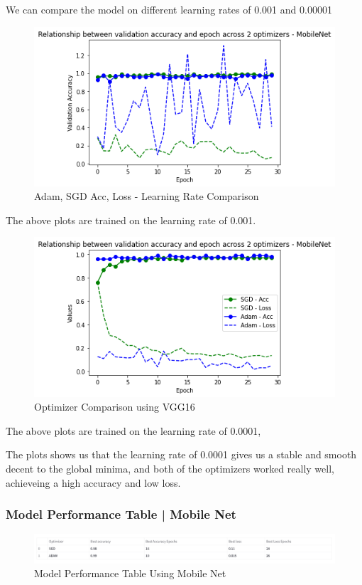 We can compare the model on different learning rates of 0.001 and 0.00001
\begin{figure}[h]
\centering
\includegraphics[scale=0.40]{diagrams/mobilenet/lr0.001_optimizer_compare.png}
\caption{Adam, SGD Acc,  Loss - Learning Rate Comparison}
\end{figure}


The above plots are trained on the learning rate of 0.001.

\pagebreak
\begin{figure}[h]
  \centering
  \includegraphics[scale=0.40]{diagrams/mobilenet/lr0.0001_optimizer_comparison.png}
  \caption{Optimizer Comparison using VGG16}
  \end{figure}

The above plots are trained on the learning rate of 0.0001,

The plots shows us that the learning rate of 0.0001 gives us a stable and smooth decent to the global minima, and both of the optimizers worked really well, achieveing a high accuracy and low loss.

\subsubsection{Model Performance Table | Mobile Net}
\begin{figure}[h]
\centering
\includegraphics[scale=0.40]{mobile-net-table.png}
\caption{Model Performance Table Using Mobile Net}
\end{figure}


